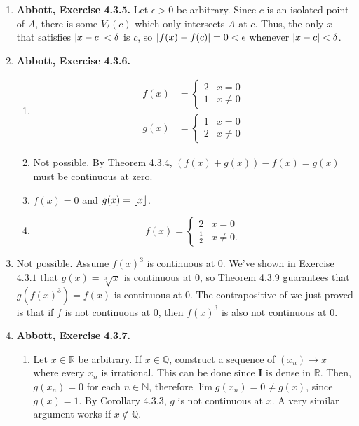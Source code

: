 \documentclass{article}
\DeclarePairedDelimiter\abs{\lvert}{\rvert}
\DeclarePairedDelimiter\floor{\lfloor}{\rfloor}
\newcommand{\N}{\mathbb{N}}
\newcommand{\Q}{\mathbb{Q}}
\newcommand{\I}{\mathbf{I}}
\newcommand{\R}{\mathbb{R}}
\newcommand{\exc}[2][Abbott]{\item \textbf{#1, Exercise #2.}}
\newcommand{\lep}[1][L]{#1et $\epsilon > 0$ be arbitrary}
\begin{document}
\begin{enumerate}
    \exc{4.3.5}
    \lep. Since $c$ is an isolated point of $A$, there is some $V_\delta (c)$ which only intersects $A$ at $c$. Thus, the only $x$ that satisfies $\abs{x-c} < \delta$ is $c$, so $\abs{f(x)-f(c)} = 0 < \epsilon$ whenever $\abs{x-c} < \delta$.
    
    \exc{4.3.6}
    \begin{enumerate}
        \item 
        \begin{align*}
            f(x) &= \begin{cases}
            2 & x = 0 \\ 
            1 & x \neq 0
            \end{cases} \\
            g(x) &= \begin{cases}
            1 & x = 0 \\ 
            2 & x \neq 0
            \end{cases}
        \end{align*}
        
        \item Not possible. By Theorem 4.3.4, $(f(x)+g(x))-f(x) = g(x)$ must be continuous at zero.
        
        \item $f(x) = 0$ and $g(x)= \floor{x}$.
        
        \item \begin{equation*}
            f(x) = \begin{cases}
            2 & x = 0 \\ 
            \frac{1}{2} & x \neq 0.
            \end{cases}
        \end{equation*}
    \end{enumerate}
    
    \item Not possible. Assume $f(x)^3$ is continuous at $0$. We've shown in Exercise $4.3.1$ that $g(x)=\sqrt[3]{x}$ is continuous at $0$, so Theorem 4.3.9 guarantees that $g(f(x)^3) = f(x)$ is continuous at $0$. The contrapositive of we just proved is that if $f$ is not continuous at $0$, then $f(x)^3$ is also not continuous at $0$.
    
    \exc{4.3.7}
    \begin{enumerate}
        \item Let $x \in \R$ be arbitrary. If $x \in \Q$, construct a sequence of $(x_n) \to x$ where every $x_n$ is irrational. This can be done since $\I$ is dense in $\R$. Then, $g(x_n) = 0$ for each $n \in \N$, therefore $\lim g(x_n) = 0 \neq g(x)$, since $g(x) = 1$. By Corollary 4.3.3, $g$ is not continuous at $x$. A very similar argument works if $x \notin \Q$.
        

\end{enumerate}
\end{enumerate}
\end{document}

